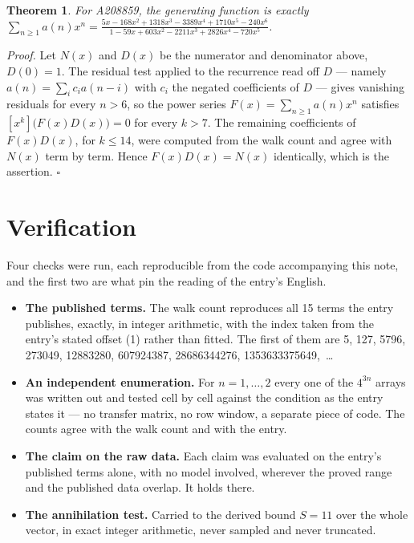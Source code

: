 \documentclass[11pt]{article}
\newtheorem{theorem}{Theorem}
\theoremstyle{definition}
\begin{document}
\begin{theorem} For A208859, the generating function is exactly $\sum_{n\ge 1} a(n)x^n = \frac{5x - 168x^{2} + 1318x^{3} - 3389x^{4} + 1710x^{5} - 240x^{6}}{1 - 59x + 603x^{2} - 2211x^{3} + 2826x^{4} - 720x^{5}}$.\end{theorem}

{\itshape Proof.} Let $N(x)$ and $D(x)$ be the numerator and denominator above, $D(0)=1$. The residual test applied to the recurrence read off $D$ --- namely $a(n) = \sum_i c_i a(n-i)$ with $c_i$ the negated coefficients of $D$ --- gives vanishing residuals for every $n > 6$, so the power series $F(x)=\sum_{n\ge 1}a(n)x^n$ satisfies $[x^k]\bigl(F(x)D(x)\bigr) = 0$ for every $k > 7$. The remaining coefficients of $F(x)D(x)$, for $k \le 14$, were computed from the walk count and agree with $N(x)$ term by term. Hence $F(x)D(x) = N(x)$ identically, which is the assertion. $\square$

\section{Verification}

Four checks were run, each reproducible from the code accompanying this note, and the first two are what pin the reading of the entry's English.

\begin{itemize}

\item {\bfseries The published terms.} The walk count reproduces all 15 terms the entry publishes, exactly, in integer arithmetic, with the index taken from the entry's stated offset (1) rather than fitted. The first of them are 5, 127, 5796, 273049, 12883280, 607924387, 28686344276, 1353633375649,~\dots

\item {\bfseries An independent enumeration.} For $n = 1,\dots,2$ every one of the $4^{3n}$ arrays was written out and tested cell by cell against the condition as the entry states it --- no transfer matrix, no row window, a separate piece of code. The counts agree with the walk count and with the entry.

\item {\bfseries The claim on the raw data.} Each claim was evaluated on the entry's published terms alone, with no model involved, wherever the proved range and the published data overlap. It holds there.

\item {\bfseries The annihilation test.} Carried to the derived bound $S = 11$ over the whole vector, in exact integer arithmetic, never sampled and never truncated.

\end{itemize}
\end{document}
